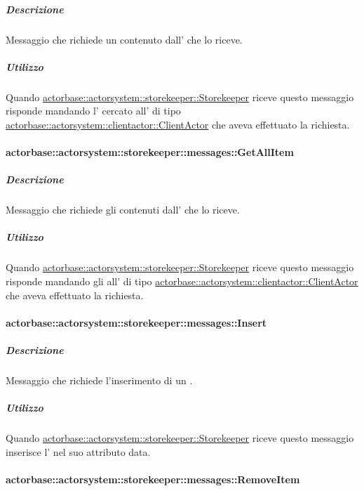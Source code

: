 \documentclass{scalatekids-article}
\begin{document}
\subparagraph{Descrizione}

Messaggio che richiede un  contenuto dall'
 che lo riceve.

\subparagraph{Utilizzo}

Quando \hyperref[sec:actorbase::actorsystem::storekeeper::Storekeeper]{actorbase::actorsystem::storekeeper::Storekeeper}
riceve questo messaggio risponde mandando l' cercato all' di tipo
\hyperref[sec:actorbase::actorsystem::clientactor::ClientActor]{actorbase::actorsystem::clientactor::ClientActor}
che aveva effettuato la richiesta.

\paragraph{actorbase::actorsystem::storekeeper::messages::GetAllItem}
\label{sec:actorbase::actorsystem::storekeeper::messages::GetAllItem}

\subparagraph{Descrizione}

Messaggio che richiede gli  contenuti dall'
 che lo riceve.

\subparagraph{Utilizzo}

Quando \hyperref[sec:actorbase::actorsystem::storekeeper::Storekeeper]{actorbase::actorsystem::storekeeper::Storekeeper}
riceve questo messaggio risponde mandando gli  all' di tipo
\hyperref[sec:actorbase::actorsystem::clientactor::ClientActor]{actorbase::actorsystem::clientactor::ClientActor}
che aveva effettuato la richiesta.

\paragraph{actorbase::actorsystem::storekeeper::messages::Insert}
\label{sec:actorbase::actorsystem::storekeeper::messages::Insert}

\subparagraph{Descrizione}

Messaggio che richiede l'inserimento di un .

\subparagraph{Utilizzo}

Quando \hyperref[sec:actorbase::actorsystem::storekeeper::Storekeeper]{actorbase::actorsystem::storekeeper::Storekeeper}
riceve questo messaggio inserisce l' nel suo attributo data.

\paragraph{actorbase::actorsystem::storekeeper::messages::RemoveItem}
\label{sec:actorbase::actorsystem::storekeeper::messages::RemoveItem}
\end{document}
